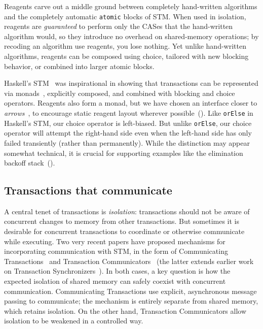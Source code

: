 \documentclass[preprint]{sigplanconf}
\begin{document}
Reagents carve out a middle ground between completely hand-written algorithms
and the completely automatic \lstinline{atomic} blocks of STM.  When used in
isolation, reagents are \emph{guaranteed} to perform only the CASes that the
hand-written algorithm would, so they introduce no overhead on shared-memory
operations; by recoding an algorithm use reagents, you lose nothing. Yet unlike hand-written algorithms, reagents can be
composed using choice, tailored with new blocking behavior, or combined
into larger atomic blocks. %

Haskell's STM~\cite{Harris2005a} was inspirational in showing that
transactions can be represented via monads~\cite{PeytonJones1993}, explicitly
composed, and combined with blocking and choice operators.  Reagents also form
a monad, but we have chosen an interface closer to
\emph{arrows}~\cite{Hughes2000}, to encourage static reagent layout wherever
possible~().  Like \lstinline{orElse} in Haskell's STM, our
choice operator is left-biased.  But unlike \lstinline{orElse}, our choice
operator will attempt the right-hand side even when the left-hand side has
only failed transiently (rather than permanently).  While the distinction may
appear somewhat technical, it is crucial for supporting examples like the
elimination backoff stack~().

\subsection{Transactions that communicate}

A central tenet of transactions is \emph{isolation}: transactions should not
be aware of concurrent changes to memory from other transactions.  But
sometimes it is desirable for concurrent transactions to coordinate or
otherwise communicate while executing.  Two very recent papers have proposed
mechanisms for incorporating communication with STM, in the form of
Communicating Transactions~\cite{Lesani2011} and Transaction
Communicators~\cite{Luchangco2011b} (the latter extends earlier work on
Transaction Synchronizers~\cite{Luchangco2005}).  In both cases, a key
question is how the expected isolation of shared memory can safely coexist
with concurrent communication.  Communicating Transactions use explicit,
asynchronous message passing to communicate; the mechanism is entirely
separate from shared memory, which retains isolation.  On the other hand,
Transaction Communicators allow isolation to be weakened in a controlled way.
\end{document}
